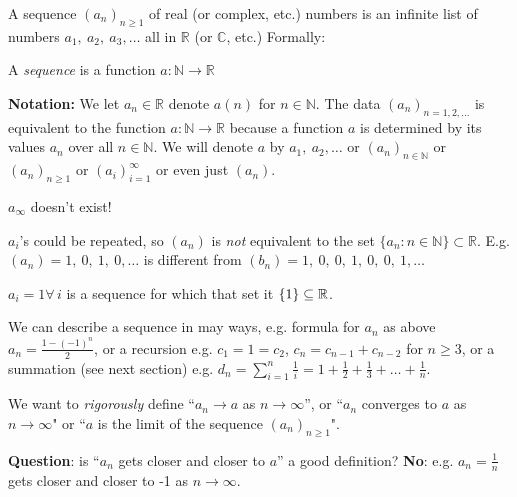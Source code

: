 \documentclass[10pt,twoside]{scrartcl}
\begin{document}
\label{sub:sequences}

A 
sequence $(a_n)_{n\geq 1}$ of real (or complex, etc.) numbers is an infinite list of numbers $a_1,~a_2,~a_3,\dots$ all in $\mathbb{R}$ (or $\mathbb{C}$, etc.) Formally:\\

\begin{definition}
	A \emph{sequence} is a function $a:\mathbb{N} \to \mathbb{R}$
\end{definition}

\textbf{Notation:} We let $a_n \in \mathbb{R}$ denote $a(n)$ for $n \in \mathbb{N}$. The data $(a_n)_{n=1,2,\dots}$ is equivalent to the function $a:\mathbb{N} \to \mathbb{R}$ because a function $a$ is determined by its values $a_n$ over all $n \in \mathbb{N}$. We will denote $a$ by $a_1,~a_2,\dots$ or $(a_n)_{n\in\mathbb{N}}$ or $(a_n)_{n\geq 1}$ or $(a_i)_{i=1}^{\infty}$ or even just $(a_n)$.\vspace*{5pt}

\begin{note}
  $a_{\infty}$ doesn't exist!
\end{note}
\begin{remark}
$a_i$'s could be repeated, so $(a_n)$ is \emph{not} equivalent to the set $\{a_n : n \in \mathbb{N}\}\subset \mathbb{R}$. E.g. $(a_n) = 1,~0,~1,~0,\dots$ is different from $(b_n) = 1,~0,~0,~1,~0,~0,~1,\dots$	
\end{remark}

\begin{example}
  $a_i = 1 \forall\,i$ is a sequence for which that set it $\{1\} \subseteq \mathbb{R}$.
\end{example}

We can describe a sequence in may ways, e.g. formula for $a_n$ as above $a_n = \frac{1-(-1)^n}{2}$, or a recursion e.g. $c_1 = 1 = c_2$, $c_n = c_{n-1} + c_{n-2}$ for $n\geq 3$, or a summation (see next section) e.g. $d_n = \sum_{i=1}^n \frac{1}{i} = 1 + \frac{1}{2} + \frac{1}{3} + \dots +\frac{1}{n}$.

We want to \emph{rigorously} define ``$a_n \to a$ as $n \to \infty$'', or ``$a_n$ converges to $a$ as $n \to \infty$" or ``$a$ is the limit of the sequence $(a_n)_{n \geq 1}$". 

\textbf{Question}: is ``$a_n$ gets closer and closer to $a$'' a good definition?
\textbf{No}: e.g. $a_n = \frac{1}{n}$ gets closer and closer to -1 as $n \to \infty$.
\end{document}
